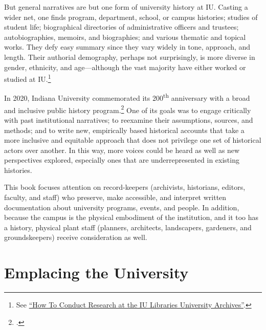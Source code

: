 \documentclass[
  american,
  letterpaper,
]{scrreprt}
\begin{document}
But general narratives are but one form of university history at IU.
Casting a wider net, one finds program, department, school, or campus
histories; studies of student life; biographical directories of
administrative officers and trustees; autobiographies, memoirs, and
biographies; and various thematic and topical works. They defy easy
summary since they vary widely in tone, approach, and length. Their
authorial demography, perhaps not surprisingly, is more diverse in
gender, ethnicity, and age---although the vast majority have either
worked or studied at IU.\footnote{See
  \href{https://guides.libraries.indiana.edu/iuarchives_howto}{``How To
  Conduct Research at the IU Libraries University Archives''}.}

In 2020, Indiana University commemorated its 200\textsuperscript{th}
anniversary with a broad and inclusive public history
program.\footnote{.}
One of its goals was to engage critically with past institutional
narratives; to reexamine their assumptions, sources, and methods; and to
write new, empirically based historical accounts that take a more
inclusive and equitable approach that does not privilege one set of
historical actors over another. In this way, more voices could be heard
as well as new perspectives explored, especially ones that are
underrepresented in existing histories.

This book focuses attention on record-keepers (archivists, historians,
editors, faculty, and staff) who preserve, make accessible, and
interpret written documentation about university programs, events, and
people. In addition, because the campus is the physical embodiment of
the institution, and it too has a history, physical plant staff
(planners, architects, landscapers, gardeners, and groundskeepers)
receive consideration as well.

\section*{Emplacing the University}\label{emplacing-the-university}

\end{document}
